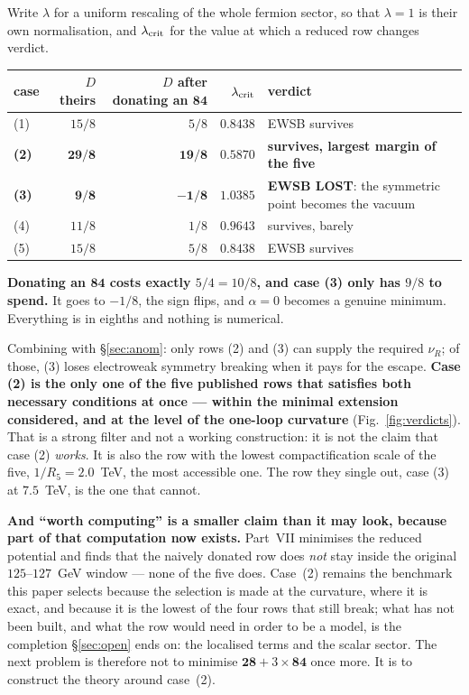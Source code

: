 \documentclass[11pt,a4paper]{article}
\newcommand{\rep}[1]{\mathbf{#1}}
\newenvironment{keyeq}
  {\begin{center}\setlength{\fboxsep}{9pt}\setlength{\fboxrule}{0.8pt}%
   \begin{lrbox}{\keyeqbox}\begin{minipage}{0.88\textwidth}}
  {\end{minipage}\end{lrbox}%
   \fcolorbox{hdrblue!55}{hdrblue!6}{\usebox{\keyeqbox}}\end{center}}
\begin{document}
Write $\lambda$ for a uniform rescaling of the whole fermion sector, so that $\lambda=1$ is their
own normalisation, and $\lambda_{\rm crit}$ for the value at which a reduced row changes verdict.

\begin{center}\small
\begin{tabular}{lrrrp{}}
\toprule
\rowcolor{hdrblue!12}
case & $D$ theirs & $D$ after donating an $\rep{84}$ & $\lambda_{\rm crit}$ & verdict\\
\midrule
(1) & $15/8$ & $5/8$ & $0.8438$ & EWSB survives\\
\rowcolor{amber!12}
\textbf{(2)} & $\mathbf{29/8}$ & $\mathbf{19/8}$ & $\mathbf{0.5870}$ & \textbf{survives, largest
margin of the five}\\
\rowcolor{warmred!12}
\textbf{(3)} & $\mathbf{9/8}$ & $\mathbf{-1/8}$ & $\mathbf{1.0385}$ & \textbf{EWSB LOST}: the
symmetric point becomes the vacuum\\
(4) & $11/8$ & $1/8$ & $0.9643$ & survives, barely\\
(5) & $15/8$ & $5/8$ & $0.8438$ & EWSB survives\\
\bottomrule
\end{tabular}
\end{center}

\begin{keyeq}
\textbf{Donating an $\rep{84}$ costs exactly $5/4=10/8$, and case (3) only has $9/8$ to spend.} It
goes to $-1/8$, the sign flips, and $\alpha=0$ becomes a genuine minimum. Everything is in eighths
and nothing is numerical.

Combining with \S\ref{sec:anom}: only rows (2) and (3) can supply the required $\nu_R$; of those,
(3) loses electroweak symmetry breaking when it pays for the escape. \textbf{Case (2) is the only one
of the five published rows that satisfies both necessary conditions at once --- within the minimal
extension considered, and at the level of the one-loop curvature} (Fig.~\ref{fig:verdicts}). That is
a strong filter and not a working construction: it is not the claim that case (2) \emph{works}. It is
also the row with the
lowest compactification scale of the five, $1/R_5=2.0$~TeV, the most accessible one. The row they
single out, case (3) at $7.5$~TeV, is the one that cannot.
\end{keyeq}

\noindent
\textbf{And ``worth computing'' is a smaller claim than it may look, because part of that
computation now exists.} Part~VII \cite{PartVII} minimises the reduced potential and finds that the
naively donated row does \emph{not} stay inside the original $125$--$127$~GeV window --- none of the
five does. Case~(2) remains the benchmark this paper selects because the selection is made at the
curvature, where it is exact, and because it is the lowest of the four rows that still break; what
has not been built, and what the row would need in order to be a model, is the completion
\S\ref{sec:open} ends on: the localised terms and the scalar sector. The next problem is therefore
not to minimise $\rep{28}+3\times\rep{84}$ once more. It is to construct the theory around case~(2).
\end{document}
